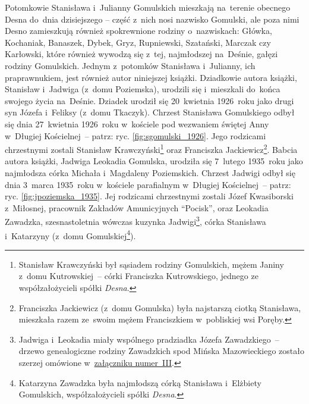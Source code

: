 Potomkowie Stanisława
i~Julianny Gomulskich
mieszkają na~terenie obecnego Desna do~dnia dzisiejszego -- część z~nich nosi
nazwisko Gomulski, ale poza nimi Desno zamieszkują również
spokrewnione rodziny o~nazwiskach: Główka, Kochaniak, Banaszek, Dybek, Gryz,
Rupniewski, Szatański, Marczak czy Karłowski, które również wywodzą się
z~tej, najmłodszej na~Deśnie, gałęzi rodziny Gomulskich. Jednym
z~potomków Stanisława
i~Julianny, ich
praprawnukiem, jest również autor niniejszej książki. Dziadkowie autora
książki, Stanisław
i~Jadwiga
(z~domu Poziemska), urodzili się i~mieszkali do~końca swojego życia na~Deśnie.
Dziadek urodził się 20~kwietnia 1926~roku jako drugi syn
Józefa
i~Feliksy (z~domu
Tkaczyk). Chrzest Stanisława
Gomulskiego odbył się dnia
27~kwietnia 1926~roku w~kościele pod wezwaniem świętej Anny w~Długiej
Kościelnej~-- patrz: ryc. \ref{fig:sgomulski_1926}. Jego rodzicami chrzestnymi
zostali Stanisław
Krawczyński\footnote{Stanisław
Krawczyński był sąsiadem rodziny Gomulskich, mężem Janiny z~domu Kutrowskiej~--
córki Franciszka Kutrowskiego, jednego ze współzałożycieli spółki \emph{Desna}.} oraz Franciszka
Jackiewicz\footnote{Franciszka
Jackiewicz (z~domu Gomulska) była najstarszą ciotką Stanisława, mieszkała
razem ze~swoim mężem Franciszkiem w~pobliskiej wsi Poręby.}. Babcia autora
książki, Jadwiga Leokadia
Gomulska,
urodziła się 7~lutego 1935~roku jako najmłodsza córka
Michała
i~Magdaleny
Poziemskich. Chrzest
Jadwigi odbył
się dnia 3~marca 1935~roku w~kościele parafialnym w~Długiej Kościelnej~--
patrz: ryc. \ref{fig:jpoziemska_1935}. Jej rodzicami chrzestnymi zostali Józef
Kwasiborski z~Miłosnej, pracownik Zakładów Amunicyjnych \enquote{Pocisk}, oraz
Leokadia Zawadzka,
szesnastoletnia wówczas kuzynka
Jadwigi\footnote{Jadwiga i~Leokadia miały wspólnego pradziadka Józefa
Zawadzkiego~--
drzewo genealogiczne rodziny Zawadzkich spod Mińska Mazowieckiego zostało
szerzej omówione w~\hyperref[sec:zawadzcy]{załączniku numer~III}.}, córka
Stanisława i~Katarzyny
(z~domu Gomulskiej\footnote{Katarzyna Zawadzka była najmłodszą córką
Stanisława
i~Elżbiety
Gomulskich, współzałożycieli spółki \emph{Desna}.}).

